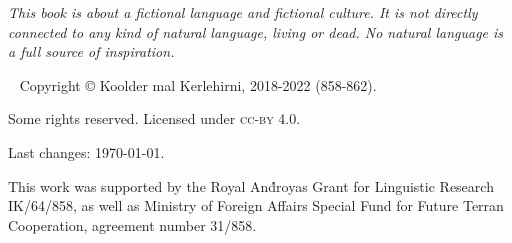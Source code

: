 \begin{fullwidth}

\emph{This book is about a fictional language and fictional culture. It is not
directly connected to any kind of natural language, living or dead. No natural
language is a full source of inspiration.}

~\vfill
\thispagestyle{empty}
\setlength{\parindent}{0pt}
\setlength{\parskip}{\baselineskip}
Copyright © Koolder mal Kerlehirni, 2018-2022 (858-862).

\bigskip

Some rights reserved. Licensed under \textsc{cc-by} 4.0.

Last changes: \today{}.

\medskip

This work was supported by the Royal And́royas Grant for Linguistic Research
IK/64/858, as well as Ministry of Foreign Affairs Special Fund for Future Terran
Cooperation, agreement number 31/858.

\end{fullwidth}